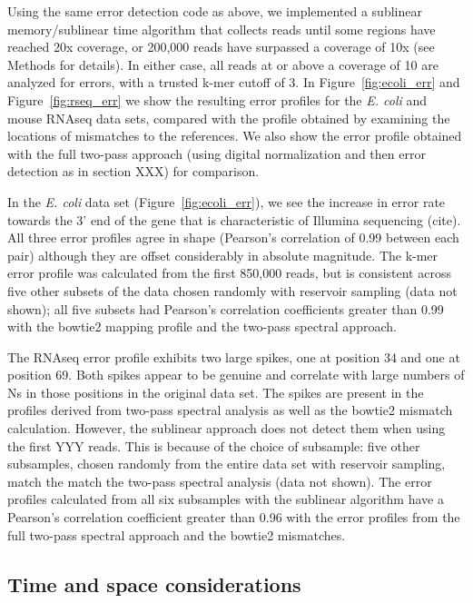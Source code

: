 \documentclass{article}
\begin{document}
Using the same error detection code as above, we implemented a
sublinear memory/sublinear time algorithm that collects reads until
some regions have reached 20x coverage, or 200,000 reads have
surpassed a coverage of 10x (see Methods for details).  In either
case, all reads at or above a coverage of 10 are analyzed for errors,
with a trusted k-mer cutoff of 3.  In Figure~\ref{fig:ecoli_err} and
Figure~\ref{fig:rseq_err} we show the resulting error profiles for the
{\em E. coli} and mouse RNAseq data sets, compared with the profile
obtained by examining the locations of mismatches to the references.
We also show the error profile obtained with the full two-pass approach
(using digital normalization and then error detection as in section XXX)
for comparison.

In the {\em E. coli} data set (Figure~\ref{fig:ecoli_err}), we see the
increase in error rate towards the 3' end of the gene that is
characteristic of Illumina sequencing (cite).  All three error
profiles agree in shape (Pearson's correlation of 0.99 between each
pair) although they are offset considerably in absolute magnitude.
The k-mer error profile was calculated from the first 850,000 reads, but
is consistent across five other subsets of the data chosen randomly
with reservoir sampling (data not shown); all five subsets had
Pearson's correlation coefficients greater than 0.99 with the
bowtie2 mapping profile and the two-pass spectral approach.

The RNAseq error profile exhibits two large spikes, one at position 34
and one at position 69.  Both spikes appear to be genuine and
correlate with large numbers of Ns in those positions in the original
data set.  The spikes are present in the profiles derived from
two-pass spectral analysis as well as the bowtie2 mismatch
calculation.  However, the sublinear approach does not detect them
when using the first YYY reads.  This is because of the choice of
subsample: five other subsamples, chosen randomly from the entire data
set with reservoir sampling, match the match the two-pass spectral
analysis (data not shown).  The error profiles calculated from all six
subsamples with the sublinear algorithm have a Pearson's correlation
coefficient greater than 0.96 with the error profiles from the full
two-pass spectral approach and the bowtie2 mismatches.


\subsection{Time and space considerations}
\end{document}
